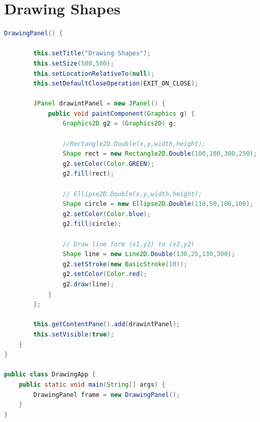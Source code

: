 \newpage
\section{Drawing Shapes}

\begin{frame}

\begin{lstlisting}[language=java]
DrawingPanel() {
		
		this.setTitle("Drawing Shapes");
		this.setSize(500,500);
		this.setLocationRelativeTo(null);
		this.setDefaultCloseOperation(EXIT_ON_CLOSE);
		
		JPanel drawintPanel = new JPanel() {
			public void paintComponent(Graphics g) {
				Graphics2D g2 = (Graphics2D) g;
				
				//Rectangle2D.Double(x,y,width,height);
				Shape rect = new Rectangle2D.Double(100,100,300,250);
				g2.setColor(Color.GREEN);
				g2.fill(rect);
				
				// Ellipse2D.Double(x,y,width,height);
				Shape circle = new Ellipse2D.Double(110,50,100,100);
				g2.setColor(Color.blue);
				g2.fill(circle);
				
				// Draw line form (x1,y2) to (x2,y2)
				Shape line = new Line2D.Double(130,25,130,300);
				g2.setStroke(new BasicStroke(10));
				g2.setColor(Color.red);
				g2.draw(line);	
			}
		};
		
		this.getContentPane().add(drawintPanel);
		this.setVisible(true);
	}
}

public class DrawingApp {
	public static void main(String[] args) {
		DrawingPanel frame = new DrawingPanel();
	}
}
\end{lstlisting}


\end{frame}


